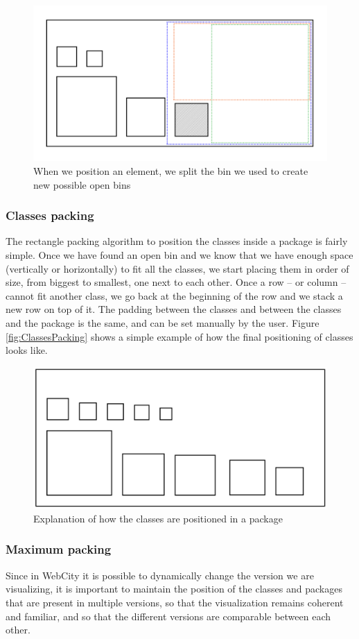 \documentclass[]{usiinfbachelorproject}
\begin{document}
\begin{figure} [H]
\centering
\includegraphics[width=.7\textwidth]{pictures/binsPlacing.png}
\caption{When we position an element, we split the bin we used to create new possible open bins}
\label{fig:binsPlacing}
\end{figure}

\subsubsection{Classes packing} \label{Classes packing}
The rectangle packing algorithm to position the classes inside a package is fairly simple. Once we have found an open bin and we know that we have enough space (vertically or horizontally) to fit all the classes, we start placing them in order of size, from biggest to smallest, one next to each other. Once a row -- or column -- cannot fit another class, we go back at the beginning of the row and we stack a new row on top of it. The padding between the classes and between the classes and the package is the same, and can be set manually by the user.
Figure \ref{fig:ClassesPacking} shows a simple example of how the final positioning of classes looks like.

\begin{figure} [H]
\centering
\includegraphics[width=.7\textwidth]{pictures/classPacking.png}
\caption{Explanation of how the classes are positioned in a package}
\label{fig:classesPacking}
\end{figure}


\subsubsection{Maximum packing} \label{Maximum packing}
Since in WebCity it is possible to dynamically change the version we are visualizing, it is important to maintain the position of the classes and packages that are present in multiple versions, so that the visualization remains coherent and familiar, and so that the different versions are comparable between each other.
\end{document}
